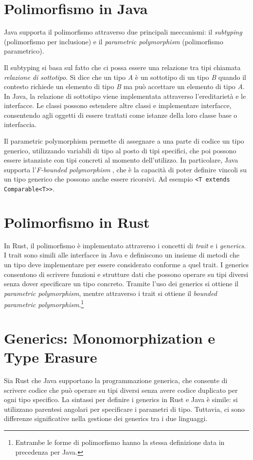 \section{Polimorfismo in Java}
Java supporta il polimorfismo attraverso due principali meccanismi: il \textit{subtyping} (polimorfismo per inclusione) e il \textit{parametric polymorphism} (polimorfismo parametrico). 

Il subtyping si basa sul fatto che ci possa essere una relazione tra tipi chiamata \textit{relazione di sottotipo}. Si dice che un tipo \textit{A} è un sottotipo di un tipo \textit{B} quando il contesto richiede un elemento di tipo \textit{B} ma può accettare un elemento di tipo \textit{A}. In Java, la relazione di sottotipo viene implementata attraverso l'ereditarietà e le interfacce. Le classi possono estendere altre classi e implementare interfacce, consentendo agli oggetti di essere trattati come istanze della loro classe base o interfaccia. 

Il parametric polymorphism permette di assegnare a una parte di codice un tipo generico, utilizzando variabili di tipo al posto di tipi specifici, che poi possono essere istanziate con tipi concreti al momento dell'utilizzo. In particolare, Java supporta l'\textit{F-bounded polymorphism} \cite{greenman-effing-bound-polymorphism}, che è la capacità di poter definire vincoli su un tipo generico che possono anche essere ricorsivi. Ad esempio \texttt{<T extends Comparable<T>}\texttt{>}.

\section{Polimorfismo in Rust}
In Rust, il polimorfismo è implementato attraverso i concetti di \textit{trait} e i \textit{generics}. I trait sono simili alle interfacce in Java e definiscono un insieme di metodi che un tipo deve implementare per essere considerato conforme a quel trait. I generics consentono di scrivere funzioni e strutture dati che possono operare su tipi diversi senza dover specificare un tipo concreto. Tramite l'uso dei generics si ottiene il \textit{parametric polymorphism}, mentre attraverso i trait si ottiene il \textit{bounded parametric polymorphism}.\footnote{Entrambe le forme di polimorfismo hanno la stessa definizione data in precedenza per Java.}

\section{Generics: Monomorphization e Type Erasure}
\label{sec:generics}
Sia Rust che Java supportano la programmazione generica, che consente di scrivere codice che può operare su tipi diversi senza avere codice duplicato per ogni tipo specifico. La sintassi per definire i generics in Rust e Java è simile: si utilizzano parentesi angolari per specificare i parametri di tipo. Tuttavia, ci sono differenze significative nella gestione dei generics tra i due linguaggi.

